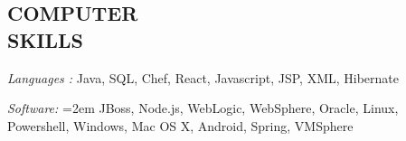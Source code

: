 \documentclass[12pt, line, margin]{res}
\begin{document}

\address{}

\begin{resume}


\section{COMPUTER \\ SKILLS} {\sl Languages :} Java, SQL, Chef, React, Javascript, JSP, XML, Hibernate

               {\sl Software:}  
			\hangindent=2em
			JBoss, Node.js, WebLogic, WebSphere, Oracle, Linux, \newline Powershell, Windows, Mac OS X, Android, Spring, VMSphere
			

\end{resume}
\end{document}
